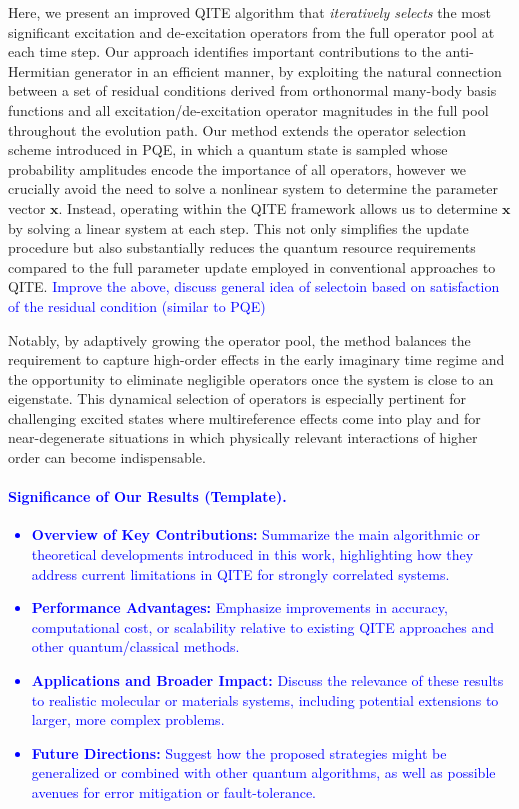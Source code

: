 \documentclass[aip,jcp,amsmath,amssymb, reprint]{revtex4-1}
\newcommand{\note}[2]{%
  \ifthenelse{\boolean{shownotes}}%
    {\textcolor{#1}{#2}}%
    {}%
}
\begin{document}
Here, we present an improved QITE algorithm that \textit{iteratively selects} the most significant excitation and de-excitation operators from the full operator pool at each time step. 
Our approach identifies important contributions to the anti-Hermitian generator in an efficient manner, by exploiting the natural connection between a set of residual conditions derived from orthonormal many-body basis functions and all excitation/de-excitation operator magnitudes in the full pool throughout the evolution path. Our method extends the operator selection scheme introduced in PQE,\cite{stair2021simulating} in which a quantum state is sampled whose probability amplitudes encode the importance of all operators, however we crucially avoid the need to solve a nonlinear system to determine the parameter vector $\mathbf{x}$. Instead, operating within the QITE framework allows us to determine $\mathbf{x}$ by solving a linear system at each step. This not only simplifies the update procedure but also substantially reduces the quantum resource requirements compared to the full parameter update employed in conventional approaches to QITE.
\note{blue}{Improve the above, discuss general idea of selectoin based on satisfaction of the residual condition (similar to PQE)}
Notably, by adaptively growing the operator pool, the method balances the requirement to capture high-order effects in the early imaginary time regime and the opportunity to eliminate negligible operators once the system is close to an eigenstate. 
This dynamical selection of operators is especially pertinent for challenging excited states where multireference effects come into play and for near-degenerate situations in which physically relevant interactions of higher order can become indispensable. 
\note{blue}{
\paragraph{Significance of Our Results (Template).}
\begin{itemize}
    \item \textbf{Overview of Key Contributions:} Summarize the main algorithmic or theoretical developments introduced in this work, highlighting how they address current limitations in QITE for strongly correlated systems.
    \item \textbf{Performance Advantages:} Emphasize improvements in accuracy, computational cost, or scalability relative to existing QITE approaches and other quantum/classical methods.
    \item \textbf{Applications and Broader Impact:} Discuss the relevance of these results to realistic molecular or materials systems, including potential extensions to larger, more complex problems.
    \item \textbf{Future Directions:} Suggest how the proposed strategies might be generalized or combined with other quantum algorithms, as well as possible avenues for error mitigation or fault-tolerance.
\end{itemize}
}
\end{document}
